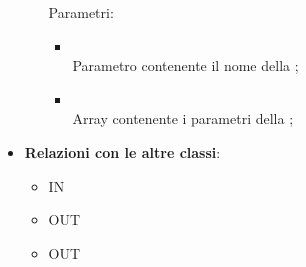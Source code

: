 \begin{itemize}
\begin{itemize}
		Parametri:
		\begin{itemize}
			\item {} \\
			Parametro contenente il nome della ;
			\item {} \\
			Array contenente i parametri della ;
		\end{itemize}
	\end{itemize}
	\item \textbf{Relazioni con le altre classi}:
	\begin{itemize}
		\item IN \hyperlink{ConversationApp_label}{}
		\item OUT \hyperlink{ConversationActionSubject_label}{}
		\item OUT \hyperlink{ConversationAction_label}{}
	\end{itemize}
\end{itemize}
\FloatBarrier

